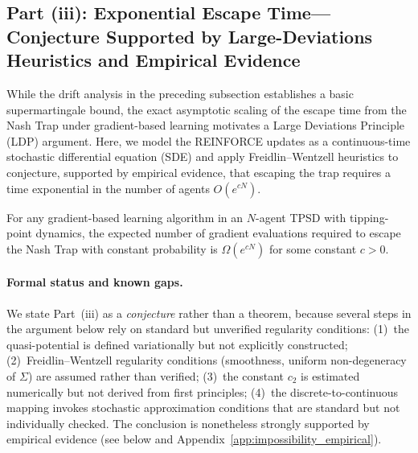 \subsection{Part (iii): Exponential Escape Time---Conjecture Supported by Large-Deviations Heuristics and Empirical Evidence}

While the drift analysis in the preceding subsection establishes a basic supermartingale bound, the exact asymptotic scaling of the escape time from the Nash Trap under gradient-based learning motivates a Large Deviations Principle (LDP) argument. Here, we model the REINFORCE updates as a continuous-time stochastic differential equation (SDE) and apply Freidlin--Wentzell heuristics to conjecture, supported by empirical evidence, that escaping the trap requires a time exponential in the number of agents $O(e^{cN})$.

\begin{conjecture}
\label{conj:escape}
For any gradient-based learning algorithm in an $N$-agent TPSD with tipping-point dynamics, the expected number of gradient evaluations required to escape the Nash Trap with constant probability is $\Omega(e^{cN})$ for some constant $c > 0$.
\end{conjecture}

\paragraph{Formal status and known gaps.}
We state Part~(iii) as a \emph{conjecture} rather than a theorem, because several steps in the argument below rely on standard but unverified regularity conditions:
(1)~the quasi-potential is defined variationally but not explicitly constructed;
(2)~Freidlin--Wentzell regularity conditions (smoothness, uniform non-degeneracy of $\Sigma$) are assumed rather than verified;
(3)~the constant $c_2$ is estimated numerically but not derived from first principles;
(4)~the discrete-to-continuous mapping invokes stochastic approximation conditions that are standard but not individually checked.
The conclusion is nonetheless strongly supported by empirical evidence (see below and Appendix~\ref{app:impossibility_empirical}).

